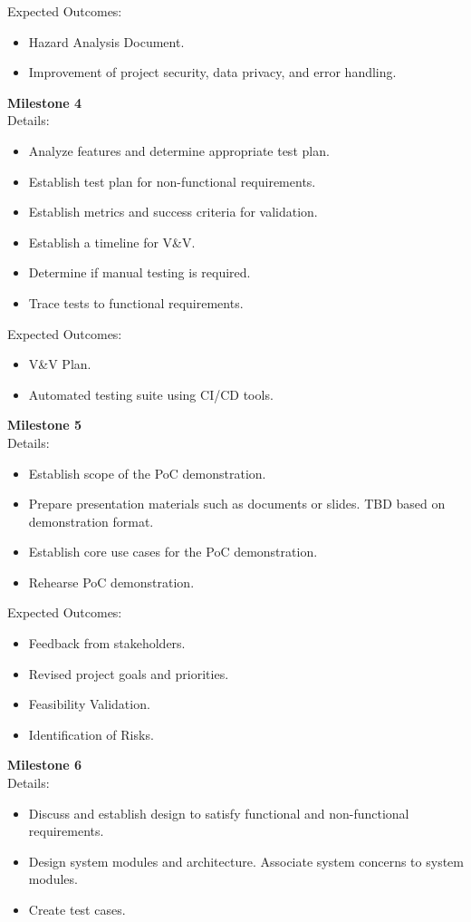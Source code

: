 \documentclass{scrreprt}
\theoremstyle{definition}
\begin{document}
Expected Outcomes:
\begin{itemize}
\item Hazard Analysis Document.
\item Improvement of project security, data privacy, and error handling.
\end{itemize}
\textbf{Milestone 4}\\
Details:
\begin{itemize}
\item Analyze features and determine appropriate test plan.
\item Establish test plan for non-functional requirements.
\item Establish metrics and success criteria for validation.
\item Establish a timeline for V\&V.
\item Determine if manual testing is required.
\item Trace tests to functional requirements.
\end{itemize}
Expected Outcomes:
\begin{itemize}
\item V\&V Plan.
\item Automated testing suite using CI/CD tools.
\end{itemize}
\textbf{Milestone 5}\\
Details:
\begin{itemize}
\item Establish scope of the PoC demonstration.
\item Prepare presentation materials such as documents or slides. TBD based on demonstration format.
\item Establish core use cases for the PoC demonstration.
\item Rehearse PoC demonstration.
\end{itemize}
Expected Outcomes:
\begin{itemize}
\item Feedback from stakeholders.
\item Revised project goals and priorities.
\item Feasibility Validation.
\item Identification of Risks.
\end{itemize}
\textbf{Milestone 6}\\
Details:
\begin{itemize}
\item Discuss and establish design to satisfy functional and non-functional requirements.
\item Design system modules and architecture. Associate system concerns to system modules.
\item Create test cases.
\end{itemize}
\end{document}
